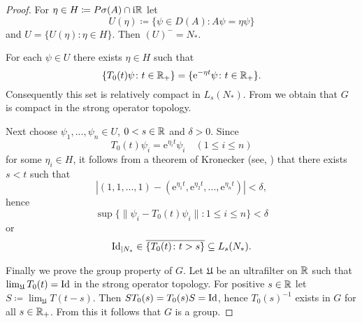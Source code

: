 \begin{proof}
For $\eta \in H \coloneqq P\sigma(A) \cap \mathrm{i}\mathbb{R}$ let
\[
U(\eta) \coloneqq \{\psi \in D(A): A\psi = \eta\psi\}
\]
and $U = \{U(\eta) \colon \eta \in H\}$.
Then $(U)^{-} = N_{*}$.

For each $\psi \in U$ there exists $\eta \in H$ such that
\[
\{T_{0}(t)\psi \colon t \in \mathbb{R}_{+}\} = \{\mathrm{e}^{-\eta t}\psi \colon t \in \mathbb{R}_{+}\} .
\]
Consequently this set is relatively compact in $L_{s}(N_{*})$.
From \citet[III.4.5]{schaefer:1966} we obtain that $G$ is compact in the strong operator topology.

Next choose $\psi_{1}, ..., \psi_{n} \in U$, $0 < s \in \mathbb{R}$ and $\delta > 0$.
Since 
\[
T_{0}(t)\psi_{i} = \mathrm{e}^{\eta_{i}t}\psi_{i} 
\quad (1 \leq i \leq n)
\]
for some $\eta_{i} \in H$, it follows from a theorem of Kronecker (see, \citet[Satz 6.1., p.77]{jacobs:1972}) that there exists $s < t$ such that
\[
|(1,1, ..., 1) - (\mathrm{e}^{\eta_{1}t}, \mathrm{e}^{\eta_{2}t}, ..., \mathrm{e}^{\eta_{n}t})| < \delta ,
\]
hence
\[
\sup\{\|\psi_{i} - T_{0}(t)\psi_{i}\| \colon 1 \leq i \leq n\} < \delta
\]
or 
\[
\operatorname{Id}_{|N_{*}} \in \overline{\{T_{0}(t) \colon t>s\}} \subseteq L_{s}(N_{*}).
\]

Finally we prove the group property of $G$.
Let $\mathfrak{U}$ be an ultrafilter on $\mathbb{R}$ such that $\lim_{\mathfrak{U}}T_{0}(t) = \operatorname{Id}$ in the strong operator topology.
For positive $s \in \mathbb{R}$ let $S \coloneqq \lim_{\mathfrak{U}}T(t-s)$.
Then $ST_{0}(s) = T_{0}(s)S = \operatorname{Id}$, hence $T_{0}(s)^{-1}$ exists in $G$ for all $s \in \mathbb{R}_{+}$.
From this it follows that $G$ is a group.
\end{proof}
